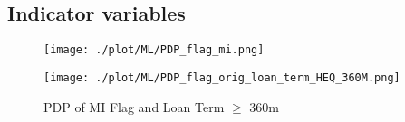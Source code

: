 \subsection{Indicator variables}

\begin{figure}[H]
\begin{minipage}{.5\textwidth}
	\centering
	\texttt{[image: ./plot/ML/PDP\_flag\_mi.png]}
\end{minipage}%
\begin{minipage}{.5\textwidth}
	\centering
	\texttt{[image: ./plot/ML/PDP\_flag\_orig\_loan\_term\_HEQ\_360M.png]}
\end{minipage}
    \caption{PDP of MI Flag and Loan Term $\geq$ 360m}
\end{figure}